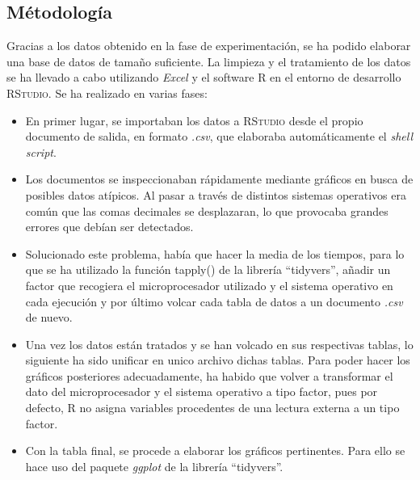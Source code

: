 \documentclass[12pt,a4paper]{article}
\begin{document}
\subsection{Métodología}
Gracias a los datos obtenido en la fase de experimentación, se ha podido elaborar una base de datos de tamaño suficiente. La limpieza y el tratamiento de los datos se ha llevado a cabo utilizando \textit{Excel} y el software \textsc{R} en el entorno de desarrollo \textsc{RStudio}. Se ha realizado en varias fases: 
\begin{itemize}
	\item En primer lugar, se importaban los datos a \textsc{RStudio} desde el propio documento de salida, en formato \textit{.csv}, que elaboraba automáticamente el \textit{shell script}. 
	\item Los documentos se inspeccionaban rápidamente mediante gráficos en busca de posibles datos atípicos. Al pasar a través de distintos sistemas operativos era común que las comas decimales se desplazaran, lo que provocaba grandes errores que debían ser detectados.
	\item Solucionado este problema, había que hacer la media de los tiempos, para lo que se ha utilizado la función \textsf{tapply()} de la librería ``tidyvers'', añadir un factor que recogiera el microprocesador utilizado y el sistema operativo en cada ejecución y por último volcar cada tabla de datos a un documento \textit{.csv} de nuevo.
	\item Una vez los datos están tratados y se han volcado en sus respectivas tablas, lo siguiente ha sido unificar en unico archivo dichas tablas. Para poder hacer los gráficos posteriores adecuadamente, ha habido que volver a transformar el dato del microprocesador y el sistema operativo a tipo factor, pues por defecto, \textsc{R} no asigna variables procedentes de una lectura externa a un tipo factor. 
	\item Con la tabla final, se procede a elaborar los gráficos pertinentes. Para ello se hace uso del paquete \textit{ggplot} de la librería ``tidyvers''.
\end{itemize}
 
\end{document}
